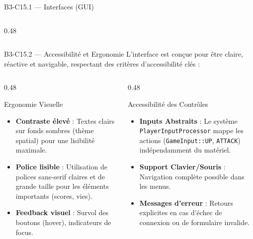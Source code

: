 \documentclass[aspectratio=169,10pt]{beamer}
\begin{document}
\begin{frame}[fragile]{B3-C15.1 — Interfaces (GUI)}
\begin{columns}[T]
\begin{column}{0.48\textwidth}
  \end{column}
  \end{columns}
\end{frame}

\begin{frame}{B3-C15.2 — Accessibilité et Ergonomie}
  \footnotesize
  L'interface est conçue pour être claire, réactive et navigable, respectant des critères d'accessibilité clés :
  
  \vspace{0.5em}
  \begin{columns}[T]
    \begin{column}{0.48\textwidth}
      \begin{block}{Ergonomie Visuelle}
        \begin{itemize}
          \item \textbf{Contraste élevé} : Textes clairs sur fonds sombres (thème spatial) pour une lisibilité maximale.
          \item \textbf{Police lisible} : Utilisation de polices sans-serif claires et de grande taille pour les éléments importants (scores, vies).
          \item \textbf{Feedback visuel} : Survol des boutons (hover), indicateurs de focus.
        \end{itemize}
      \end{block}
    \end{column}
    
    \begin{column}{0.48\textwidth}
      \begin{block}{Accessibilité des Contrôles}
        \begin{itemize}
          \item \textbf{Inputs Abstraits} : Le système \texttt{PlayerInputProcessor} mappe les actions (\texttt{GameInput::UP}, \texttt{ATTACK}) indépendamment du matériel.
          \item \textbf{Support Clavier/Souris} : Navigation complète possible dans les menus.
          \item \textbf{Messages d'erreur} : Retours explicites en cas d'échec de connexion ou de formulaire invalide.
        \end{itemize}
      \end{block}
    \end{column}
  \end{columns}
\end{frame}
\end{document}
